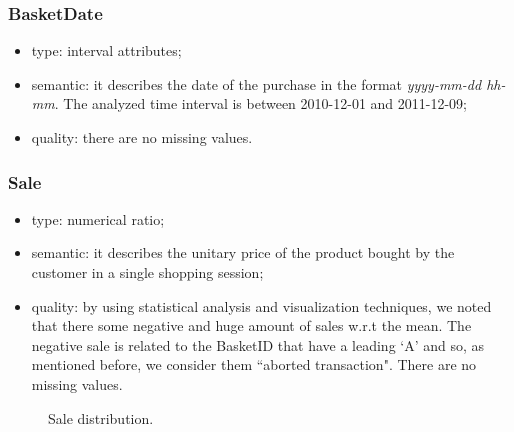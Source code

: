 \documentclass{article}
\begin{document}
\subsubsection{BasketDate}
\begin{itemize}
    \item type: interval attributes;
    \item semantic: it describes the date of the purchase in the format \textit{yyyy-mm-dd hh-mm}. The analyzed time interval is between 2010-12-01 and 2011-12-09;
    \item quality: there are no missing values.
\end{itemize}

\subsubsection{Sale}
\begin{itemize}
    \item type: numerical ratio;
    \item semantic: it describes the unitary price of the product bought by the customer in a single shopping session;
    \item quality: by using statistical analysis and visualization techniques, we noted that there some negative and huge amount of sales w.r.t the mean. The negative sale is related to the BasketID that have a leading `A' and so, as mentioned before, we consider them “aborted transaction". There are no missing values.
\end{itemize}
\begin{center}
	\begin{figure}[ht!]
		\caption{Sale distribution.}
	\end{figure}
\end{center}
\end{document}
